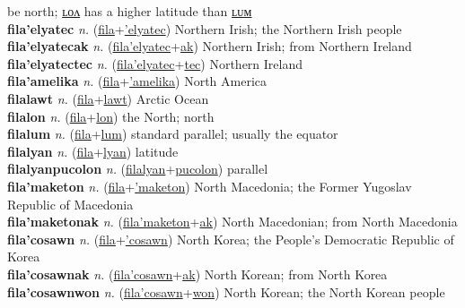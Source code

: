 be north; \hyperref[filalon]{ʟᴏᴧ} has a higher latitude than \hyperref[filalum]{ʟᴜᴍ} \label{fila} \\
\textbf{fila'elyatec} \textit{n.} (\hyperref[fila]{fila}+\hyperref['elyatec]{'elyatec})
Northern Irish; the Northern Irish people \label{fila'elyatec} \\
\textbf{fila'elyatecak} \textit{n.} (\hyperref[fila'elyatec]{fila'elyatec}+\hyperref[ak]{ak})
Northern Irish; from Northern Ireland \label{fila'elyatecak} \\
\textbf{fila'elyatectec} \textit{n.} (\hyperref[fila'elyatec]{fila'elyatec}+\hyperref[tec]{tec})
Northern Ireland \label{fila'elyatectec} \\
\textbf{fila'amelika} \textit{n.} (\hyperref[fila]{fila}+\hyperref['amelika]{'amelika})
North America \label{fila'amelika} \\
\textbf{filalawt} \textit{n.} (\hyperref[fila]{fila}+\hyperref[lawt]{lawt})
Arctic Ocean \label{filalawt} \\
\textbf{filalon} \textit{n.} (\hyperref[fila]{fila}+\hyperref[lon]{lon})
the North; north \label{filalon} \\
\textbf{filalum} \textit{n.} (\hyperref[fila]{fila}+\hyperref[lum]{lum})
standard parallel; usually the equator \label{filalum} \\
\textbf{filalyan} \textit{n.} (\hyperref[fila]{fila}+\hyperref[lyan]{lyan})
latitude \label{filalyan} \\
\textbf{filalyanpucolon} \textit{n.} (\hyperref[filalyan]{filalyan}+\hyperref[pucolon]{pucolon})
parallel \label{filalyanpucolon} \\
\textbf{fila'maketon} \textit{n.} (\hyperref[fila]{fila}+\hyperref['maketon]{'maketon})
North Macedonia; the Former Yugoslav Republic of Macedonia \label{fila'maketon} \\
\textbf{fila'maketonak} \textit{n.} (\hyperref[fila'maketon]{fila'maketon}+\hyperref[ak]{ak})
North Macedonian; from North Macedonia \label{fila'maketonak} \\
\textbf{fila'cosawn} \textit{n.} (\hyperref[fila]{fila}+\hyperref['cosawn]{'cosawn})
North Korea; the People’s Democratic Republic of Korea \label{fila'cosawn} \\
\textbf{fila'cosawnak} \textit{n.} (\hyperref[fila'cosawn]{fila'cosawn}+\hyperref[ak]{ak})
North Korean; from North Korea \label{fila'cosawnak} \\
\textbf{fila'cosawnwon} \textit{n.} (\hyperref[fila'cosawn]{fila'cosawn}+\hyperref[won]{won})
North Korean; the North Korean people \label{fila'cosawnwon} \\
